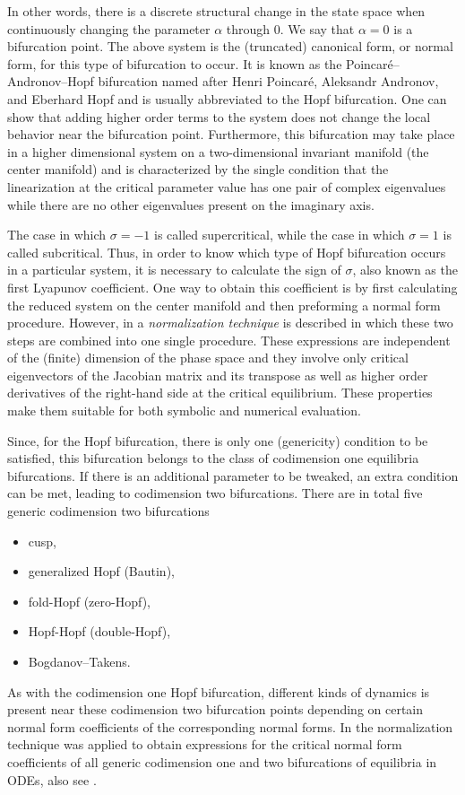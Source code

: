 In other words, there is a discrete structural change in the state space when
continuously changing the parameter $\alpha$ through $0$. We say that
$\alpha=0$ is a bifurcation point. The above system is the (truncated)
canonical form, or normal form, for this type of bifurcation to occur. It is
known as the Poincar\'e–Andronov–Hopf bifurcation named after Henri Poincar\'e,
Aleksandr Andronov, and Eberhard Hopf and is usually abbreviated to the Hopf
bifurcation. One can show that adding higher order terms to the system does
not change the local behavior near the bifurcation point. Furthermore, this
bifurcation may take place in a higher dimensional system on a two-dimensional
invariant manifold (the center manifold) and is characterized by the single
condition that the linearization at the critical parameter value has one pair
of complex eigenvalues while there are no other eigenvalues present on the
imaginary axis. 

The case in which $\sigma=-1$ is called supercritical, while the case in which
$\sigma=1$ is called subcritical. Thus, in order to know which type of Hopf
bifurcation occurs in a particular system, it is necessary to calculate the
sign of $\sigma$, also known as the first Lyapunov coefficient. One way to
obtain this coefficient is by first calculating the reduced system on the
center manifold and then preforming a normal form procedure. However, in
\cite{Coullet1983competinginstabilities} a \emph{normalization technique} is
described in which these two steps are combined into one single procedure. These
expressions are independent of the (finite) dimension of the phase space and
they involve only critical eigenvectors of the Jacobian matrix and its
transpose as well as higher order derivatives of the right-hand side at the
critical equilibrium. These properties make them suitable for both symbolic and
numerical evaluation.

Since, for the Hopf bifurcation, there is only one (genericity) condition to be
satisfied, this bifurcation belongs to the class of codimension one equilibria
bifurcations. If there is an additional parameter to be tweaked, an extra
condition can be met, leading to codimension two bifurcations. There are in
total five generic codimension two bifurcations
\begin{itemize}
    \item cusp,
    \item generalized Hopf (Bautin),
    \item fold-Hopf (zero-Hopf),
    \item Hopf-Hopf (double-Hopf),
    \item Bogdanov--Takens.
\end{itemize} 
As with the codimension one Hopf bifurcation, different kinds of dynamics is
present near these codimension two bifurcation points depending on certain
normal form coefficients of the corresponding normal forms. In
\cite{Kuznetsov1999} the normalization technique was applied to obtain
expressions for the critical normal form coefficients of all generic
codimension one and two bifurcations of equilibria in ODEs, also see \cite[\S
8.7]{Kuznetsov2004}. 

